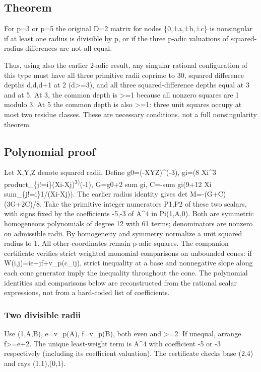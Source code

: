 \documentclass[
  10pt,
]{article}
\begin{document}
\subsection{Theorem}\label{theorem-1}

For p=3 or p=5 the original D=2 matrix for nodes \{0,±a,±b,±c\} is
nonsingular if at least one radius is divisible by p, or if the three
p-adic valuations of squared-radius differences are not all equal.

Thus, using also the earlier 2-adic result, any singular rational
configuration of this type must have all three primitive radii coprime
to 30, squared difference depths d,d,d+1 at 2 (d\textgreater=3), and all
three squared-difference depths equal at 3 and at 5. At 3, the common
depth is \textgreater=1 because all nonzero squares are 1 modulo 3. At 5
the common depth is also \textgreater=1: three unit squares occupy at
most two residue classes. These are necessary conditions, not a full
nonsingularity theorem.

\subsection{Polynomial proof}\label{polynomial-proof-1}

Let X,Y,Z denote squared radii. Define g0=(-XYZ)\^{}(-3), gi=(8 Xi\^{}3
product\_\{j!=i\}(Xi-Xj)\textsuperscript{3)}(-1), G=g0+2 sum gi, C=-sum
gi(9+12 Xi sum\_\{j!=i\}1/(Xi-Xj)). The earlier radius identity gives
det M=-(G+C)(3G+2C)/8. Take the primitive integer numerators P1,P2 of
these two scalars, with signs fixed by the coefficients -5,-3 of A\^{}4
in Pi(1,A,0). Both are symmetric homogeneous polynomials of degree 12
with 61 terms; denominators are nonzero on admissible radii. By
homogeneity and symmetry normalize a unit squared radius to 1. All other
coordinates remain p-adic squares. The companion certificate verifies
strict weighted monomial comparisons on unbounded cones: if
W(i,j)=ie+jf+v\_p(c\_ij), strict inequality at a base and nonnegative
slope along each cone generator imply the inequality throughout the
cone. The polynomial identities and comparisons below are reconstructed
from the rational scalar expressions, not from a hard-coded list of
coefficients.

\subsubsection{Two divisible radii}\label{two-divisible-radii}

Use (1,A,B), e=v\_p(A), f=v\_p(B), both even and \textgreater=2. If
unequal, arrange f\textgreater=e+2. The unique least-weight term is
A\^{}4 with coefficient -5 or -3 respectively (including its coefficient
valuation). The certificate checks base (2,4) and rays (1,1),(0,1).
\end{document}
